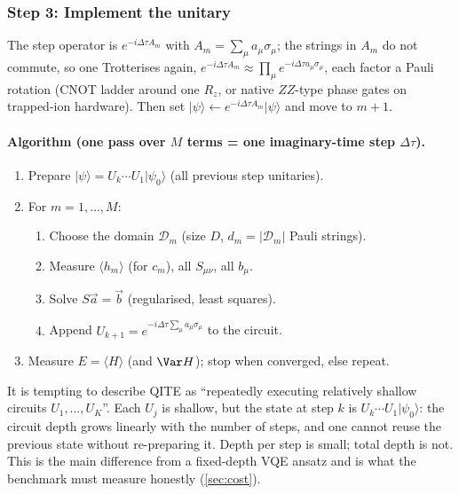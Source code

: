 \documentclass[11pt,a4paper]{article}
\newcommand{\ket}[1]{\lvert #1\rangle}
\newcommand{\expect}[1]{\langle #1\rangle}
\begin{document}
\subsubsection*{Step 3: Implement the unitary}
The step operator is $e^{-i\Delta\tau A_m}$ with $A_m=\sum_\mu a_\mu\sigma_\mu$; the strings in
$A_m$ do not commute, so one Trotterises again,
$e^{-i\Delta\tau A_m}\approx\prod_\mu e^{-i\Delta\tau a_\mu\sigma_\mu}$, each factor a Pauli
rotation (CNOT ladder around one $R_z$, or native $ZZ$-type phase gates on trapped-ion
hardware). Then set $\ket\psi\leftarrow e^{-i\Delta\tau A_m}\ket\psi$ and move to $m+1$.

\paragraph{Algorithm (one pass over $M$ terms = one imaginary-time step $\Delta\tau$).}
\begin{enumerate}
\item Prepare $\ket{\psi}=U_k\cdots U_1\ket{\psi_0}$ (all previous step unitaries).
\item For $m=1,\dots,M$:
  \begin{enumerate}
  \item Choose the domain $\mathcal D_m$ (size $D$, $d_m=\lvert\mathcal D_m\rvert$ Pauli strings).
  \item Measure $\expect{h_m}$ (for $c_m$), all $S_{\mu\nu}$, all $b_\mu$.
  \item Solve $S\vec a=\vec b$ (regularised, least squares).
  \item Append $U_{k+1}=e^{-i\Delta\tau\sum_\mu a_\mu\sigma_\mu}$ to the circuit.
  \end{enumerate}
\item Measure $E=\expect H$ (and $\Var H$); stop when converged, else repeat.
\end{enumerate}

\begin{remark}
It is tempting to describe QITE as ``repeatedly executing relatively shallow circuits
$U_1,\dots,U_K$''. Each $U_j$ is shallow, but the state at step $k$ is $U_k\cdots U_1\ket{\psi_0}$: the
circuit depth \alert{grows linearly with the number of steps}, and one cannot reuse the previous
state without re-preparing it. Depth per step is small; total depth is not. This is the main
difference from a fixed-depth VQE ansatz and is what the benchmark must measure honestly
(\cref{sec:cost}).
\end{remark}
\end{document}
